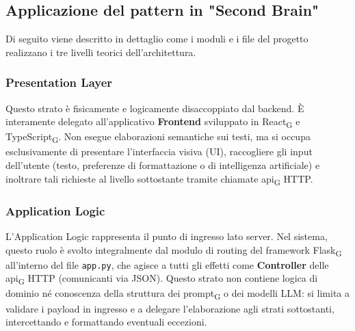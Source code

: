 \documentclass[11pt,a4paper]{article}
\newcommand{\gls}[1]{#1\textsubscript{G}}
\begin{document}
\subsection{Applicazione del pattern in "Second Brain"}
Di seguito viene descritto in dettaglio come i moduli e i file del progetto realizzano i tre livelli teorici dell'architettura.


\subsubsection{Presentation Layer}
Questo strato è fisicamente e logicamente disaccoppiato dal backend. È interamente delegato all'applicativo \textbf{Frontend} sviluppato in \gls{React} e \gls{TypeScript}. Non esegue elaborazioni semantiche sui testi, ma si occupa esclusivamente di presentare l'interfaccia visiva (UI), raccogliere gli input dell'utente (testo, preferenze di formattazione o di intelligenza artificiale) e inoltrare tali richieste al livello sottostante tramite chiamate \gls{api} HTTP.

\subsubsection{Application Logic}
L'Application Logic rappresenta il punto di ingresso lato server. Nel sistema, questo ruolo è svolto integralmente dal modulo di routing del framework \gls{Flask} all'interno del file \texttt{app.py}, che agisce a tutti gli effetti come \textbf{Controller} delle \gls{api} HTTP (comunicanti via JSON). Questo strato non contiene logica di dominio né conoscenza della struttura dei \gls{prompt} o dei modelli LLM: si limita a validare i payload in ingresso e a delegare l'elaborazione agli strati sottostanti, intercettando e formattando eventuali eccezioni.
\end{document}

